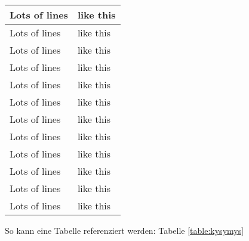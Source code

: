 \begin{longtable}[l]{| p{40mm} | p{95mm} |}
    \hline
    Lots of lines & like this\\
    \hline
    Lots of lines & like this\\
    \hline
    Lots of lines & like this\\
    \hline
    Lots of lines & like this\\
    \hline
    Lots of lines & like this\\
    \hline
    Lots of lines & like this\\
    \hline
    Lots of lines & like this\\
    \hline
    Lots of lines & like this\\
    \hline
    Lots of lines & like this\\
    \hline
    Lots of lines & like this\\
    \hline
    Lots of lines & like this\\
    \hline
    Lots of lines & like this\\
    \hline
\end{longtable}

So kann eine Tabelle referenziert werden: Tabelle \ref{table:kysymys}